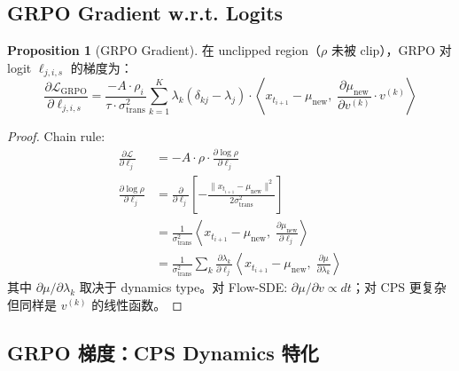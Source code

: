 \documentclass[11pt,a4paper]{article}
\newcommand{\loss}{\mathcal{L}}
\theoremstyle{definition}
\newtheorem{proposition}{Proposition}
\begin{document}
\subsection{GRPO Gradient w.r.t. Logits}

\begin{proposition}[GRPO Gradient]
在 unclipped region（$\rho$ 未被 clip），GRPO 对 logit $\ell_{j,i,s}$ 的梯度为：
\begin{equation}
\boxed{
\frac{\partial \loss_{\mathrm{GRPO}}}{\partial \ell_{j,i,s}} = \frac{-A \cdot \rho_i}{\tau \cdot \sigma_{\mathrm{trans}}^2} \sum_{k=1}^K \lambda_k(\delta_{kj} - \lambda_j) \cdot \left\langle x_{t_{i+1}} - \mu_{\mathrm{new}},\; \frac{\partial \mu_{\mathrm{new}}}{\partial v^{(k)}} \cdot v^{(k)} \right\rangle
}
\label{eq:grpo_gradient}
\end{equation}
\end{proposition}

\begin{proof}
Chain rule:
\begin{align}
\frac{\partial \loss}{\partial \ell_j} &= -A \cdot \rho \cdot \frac{\partial \log \rho}{\partial \ell_j} \\
\frac{\partial \log \rho}{\partial \ell_j} &= \frac{\partial}{\partial \ell_j}\left[-\frac{\|x_{t_{i+1}} - \mu_{\mathrm{new}}\|^2}{2\sigma_{\mathrm{trans}}^2}\right] \\
&= \frac{1}{\sigma_{\mathrm{trans}}^2}\left\langle x_{t_{i+1}} - \mu_{\mathrm{new}},\; \frac{\partial \mu_{\mathrm{new}}}{\partial \ell_j}\right\rangle \\
&= \frac{1}{\sigma_{\mathrm{trans}}^2} \sum_k \frac{\partial \lambda_k}{\partial \ell_j} \left\langle x_{t_{i+1}} - \mu_{\mathrm{new}},\; \frac{\partial \mu}{\partial \lambda_k}\right\rangle
\end{align}
其中 $\partial \mu / \partial \lambda_k$ 取决于 dynamics type。对 Flow-SDE: $\partial \mu / \partial v \propto dt$；对 CPS 更复杂但同样是 $v^{(k)}$ 的线性函数。
\end{proof}

\subsection{GRPO 梯度：CPS Dynamics 特化}
\end{document}
